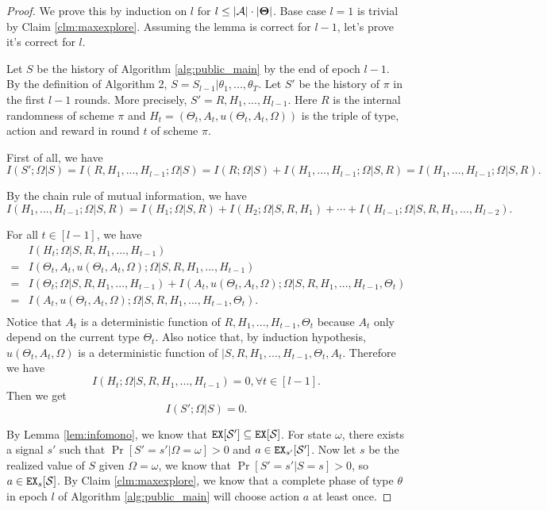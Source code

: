 \begin{proof}
We prove this by induction on $l$ for $l \leq |\mathcal{A}|\cdot |\bold{\Theta}|$. Base case $l=1$ is trivial by Claim \ref{clm:maxexplore}. Assuming the lemma is correct for $l-1$, let's prove it's correct for $l$.

Let $S$ be the history of Algorithm \ref{alg:public_main} by the end of epoch $l-1$. By the definition of Algorithm 2, $S = S_{l-1} | \theta_1,...,\theta_T$.  Let $S'$ be the history of $\pi$ in the first $l-1$ rounds. More precisely, $S' = R, H_1,...,H_{l-1}$. Here $R$ is the internal randomness of scheme $\pi$ and $H_t = (\Theta_t, A_t, u(\Theta_t, A_t, \Omega))$ is the triple of type, action and reward in round $t$ of scheme $\pi$.

First of all, we have
\[
I(S'; \Omega| S) = I(R,H_1,...,H_{l-1}; \Omega| S)  = I(R; \Omega| S) + I(H_1,...,H_{l-1}; \Omega|S, R) = I(H_1,...,H_{l-1}; \Omega|S, R).
\]

By the chain rule of mutual information, we have
\[
 I(H_1,...,H_{l-1}; \Omega|S, R) = I(H_1;\Omega|S,R) + I(H_2;\Omega|S, R ,H_1) + \cdots + I(H_{l-1}; \Omega|S,R,H_1,...,H_{l-2}).
\]

For all $t \in [l-1]$, we have
\begin{align*}
&I(H_t; \Omega|S,R,H_1,...,H_{t-1}) \\
=& I(\Theta_t, A_t, u(\Theta_t, A_t, \Omega); \Omega|S,R,H_1,...,H_{t-1}) \\
=& I(\Theta_t ; \Omega|S,R,H_1,...,H_{t-1}) +  I(A_t, u(\Theta_t, A_t, \Omega); \Omega|S,R,H_1,...,H_{t-1},\Theta_t) \\
=& I(A_t, u(\Theta_t, A_t, \Omega); \Omega|S,R,H_1,...,H_{t-1},\Theta_t). \\
\end{align*}
Notice that $A_t$ is a deterministic function of $R,H_1,...,H_{t-1},\Theta_t$ because $A_t$ only depend on the current type $\Theta_t$. Also notice that, by induction hypothesis, $u(\Theta_t, A_t, \Omega)$ is a deterministic function of $|S,R,H_1,...,H_{t-1},\Theta_t, A_t$. Therefore we have
\[
I(H_t; \Omega|S,R,H_1,...,H_{t-1}) = 0, \forall t \in [l-1].
\]
Then we get
\[
I(S'; \Omega | S) = 0.
\]

By Lemma \ref{lem:infomono}, we know that $\mathtt{EX}[\mathcal{S}'] \subseteq \mathtt{EX}[\mathcal{S}]$. For state $\omega$, there exists a signal $s'$ such that $\Pr[S'=s'|\Omega =\omega] >0 $ and $a \in \mathtt{EX}_{s'} [\mathcal{S}']$. Now let $s$ be the realized value of $S$ given $\Omega = \omega$, we know that $\Pr[S'=s'|S=s] >0$, so $a \in \mathtt{EX}_s[\mathcal{S}]$. By Claim \ref{clm:maxexplore}, we know that a complete phase of type $\theta$ in epoch $l$ of Algorithm \ref{alg:public_main} will choose action $a$ at least once.


\end{proof}
